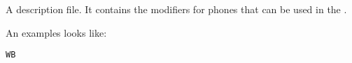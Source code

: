 
\section{}

A  description file. It contains the modifiers for
phones that can be used in the .

An examples looks like:

\begin{verbatim}
WB
\end{verbatim}


